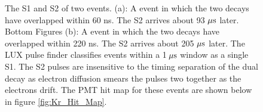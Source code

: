 \renewcommand{\baselinestretch}{1}
\small\normalsize
\begin{figure}[p!]\centering
 

\caption{The S1 and S2 of two \KrCal events. (a): A \KrCal event in which the two decays have overlapped within 60 ns. The S2 arrives about 93 $\rm \mu s$ later. Bottom Figures (b): A \KrCal event in which the two decays have overlapped within 220 ns. The S2 arrives about 205 $\rm \mu s$ later. The LUX pulse finder classifies events within a 1$\rm \, \mu s$ window as a single S1. The S2 pulses are insensitive to the timing separation of the dual decay as electron diffusion smears the pulses two together as the electrons drift. The PMT hit map for these events are shown below in figure \ref{fig:Kr_Hit_Map}.}
\label{fig:Kr_Waveform}
\end{figure}
\renewcommand{\baselinestretch}{2}
\small\normalsize


